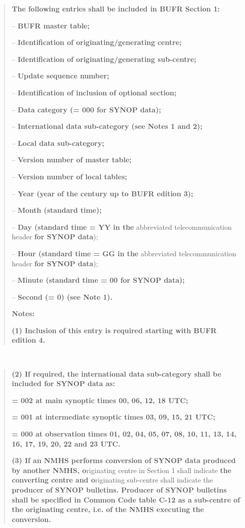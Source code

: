 \begin{quote}
\textbf{The following entries shall be included in BUFR Section 1:}

-- \textbf{BUFR master table;}

-- \textbf{Identification of originating/generating centre;}

-- \textbf{Identification of originating/generating sub-centre;}

-- \textbf{Update sequence number;}

-- \textbf{Identification of inclusion of optional section;}

-- \textbf{Data category (= 000 for SYNOP data);}

-- \textbf{International data sub-category (see Notes 1 and 2);}

-- \textbf{Local data sub-category;}

-- \textbf{Version number of master table;}

-- \textbf{Version number of local tables;}

-- \textbf{Year (year of the century up to BUFR edition 3);}

-- \textbf{Month (standard time);}

-- \textbf{Day (standard time = YY in the} abbreviated telecommunication header \textbf{for SYNOP data});

-- \textbf{Hour (standard time = GG in the} abbreviated telecommunication header \textbf{for SYNOP data});

-- \textbf{Minute (standard time = 00 for SYNOP data);}

-- \textbf{Second (= 0) (see Note 1).}

\textbf{Notes:}

\textbf{(1) Inclusion of this entry is required starting with BUFR edition 4.}
\end{quote}

\textbf{\\
}

\begin{quote}
\textbf{(2) If required, the international data sub-category shall be included for SYNOP data as:}

\textbf{= 002 at main synoptic times 00, 06, 12, 18 UTC;}

\textbf{= 001 at intermediate synoptic times 03, 09, 15, 21 UTC;}

\textbf{= 000 at observation times 01, 02, 04, 05, 07, 08, 10, 11, 13, 14, 16, 17, 19, 20, 22 and 23 UTC.}

\textbf{(3) If an NMHS performs conversion of SYNOP data produced by another NMHS, o}riginating centre in Section 1 shall indicate \textbf{the converting centre and o}riginating sub-centre shall indicate the \textbf{producer of SYNOP bulletins. Producer of SYNOP bulletins shall be specified in Common Code table C-12 as a sub-centre of the originating centre, i.e. of the NMHS executing the conversion.}
\end{quote}

